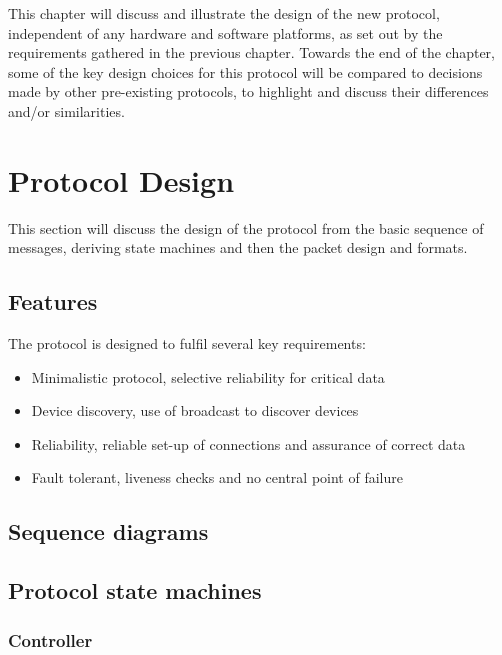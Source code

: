
This chapter will discuss and illustrate the design of the new protocol, independent of any hardware and software platforms, as set out by the requirements gathered in the previous chapter. Towards the end of the chapter, some of the key design choices for this protocol will be compared to decisions made by other pre-existing protocols, to highlight and discuss their differences and/or similarities.




\section{Protocol Design} %
\label{sec:protocol_design}
This section will discuss the design of the protocol from the basic sequence of messages, deriving state machines and then the packet design and formats.

\subsection{Features} %
\label{sub:features}
The protocol is designed to fulfil several key requirements:
\begin{itemize}
	\item Minimalistic protocol, selective reliability for critical data
	\item Device discovery, use of broadcast to discover devices
	\item Reliability, reliable set-up of connections and assurance of correct data
	\item Fault tolerant, liveness checks and no central point of failure
\end{itemize}

\subsection{Sequence diagrams} %
\label{sub:message_passing}

\subsection{Protocol state machines} %
\label{sub:states}

\subsubsection{Controller} %
\label{ssub:controller}

